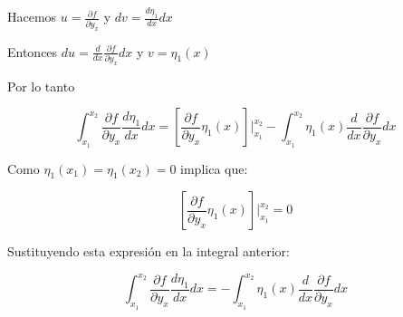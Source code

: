 Hacemos $u=\frac{\partial f}{\partial y_{x}}$ y $dv=\frac{d \eta_{1}}{dx} dx$

\vspace*{0.5cm}

Entonces $du=\frac{d}{dx} \frac{\partial f}{\partial y_{x}} dx$ y $v=\eta_{1} (x)$

\vspace*{0.5cm}

Por lo tanto

\begin{equation*}
    \int_{x_{1}}^{x_{2}} \frac{\partial f}{\partial y_{x}}  \frac{d \eta_{1}}{dx} dx =
    \left[ \frac{\partial f}{\partial y_{x}} \eta_{1} (x) \right]  \bigg\rvert_{x_{1}}^{x_{2}} -
    \int_{x_{1}}^{x_{2}} \eta_{1} (x) \frac{d}{dx} \frac{\partial f}{\partial y_{x}} dx
\end{equation*}

\vspace*{0.5cm}

Como $\eta_{1} (x_{1})=\eta_{1} (x_{2})=0$ implica que:

\begin{equation*}
    \left[ \frac{\partial f}{\partial y_{x}} \eta_{1} (x) \right]  \bigg\rvert_{x_{1}}^{x_{2}} = 0
\end{equation*}

\vspace*{0.5cm}

Sustituyendo esta expresión en la integral anterior:

\vspace*{0.5cm}

\begin{equation}
    \int_{x_{1}}^{x_{2}} \frac{\partial f}{\partial y_{x}}  \frac{d \eta_{1}}{dx} dx =
    -\int_{x_{1}}^{x_{2}} \eta_{1} (x) \frac{d}{dx} \frac{\partial f}{\partial y_{x}} dx
\end{equation}
